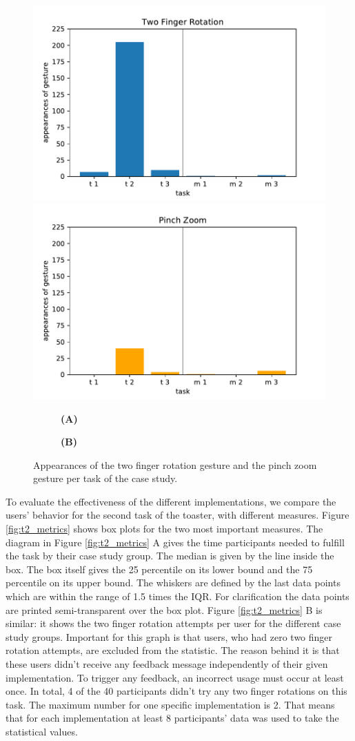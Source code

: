 \documentclass[11pt, a4paper]{article}
\begin{document}
			\begin{figure}[H]
				\centering
				\includegraphics[width=.49\textwidth]{img/plot/plot_tfr.pdf}
				\includegraphics[width=.49\textwidth]{img/plot/plot_pz.pdf}
				\begin{subfigure}[t]{.49\textwidth}\centering
					\textbf{(A)}
				\end{subfigure}
				\begin{subfigure}[t]{.49\textwidth}\centering
					\textbf{(B)}
				\end{subfigure}
				\caption{Appearances of the two finger rotation gesture and the pinch zoom gesture per task of the case study. }
				\label{fig:tfr_v_pz}
			\end{figure}

			To evaluate the effectiveness of the different implementations, we compare the users' behavior for the second task of the toaster, with different measures. Figure \ref{fig:t2_metrics} shows box plots for the two most important measures. The diagram in Figure \ref{fig:t2_metrics} A gives the time participants needed to fulfill the task by their case study group. The median is given by the line inside the box. The box itself gives the 25 percentile on its lower bound and the 75 percentile on its upper bound. The whiskers are defined by the last data points which are within the range of 1.5 times the IQR. For clarification the data points are printed semi-transparent over the box plot. Figure \ref{fig:t2_metrics} B is similar: it shows the two finger rotation attempts per user for the different case study groups. Important for this graph is that users, who had zero two finger rotation attempts, are excluded from the statistic. The reason behind it is that these users didn't receive any feedback message independently of their given implementation. To trigger any feedback, an incorrect usage must occur at least once. In total, 4 of the 40 participants didn't try any two finger rotations on this task. The maximum number for one specific implementation is 2. That means that for each implementation at least 8 participants' data was used to take the statistical values.
\end{document}
